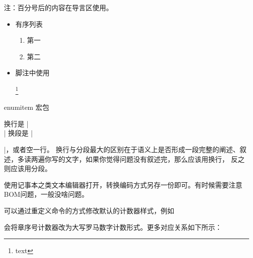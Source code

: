 




注：百分号后的内容在导言区使用。
\begin{itemize}
\item 有序列表
  \begin{texlist}
    \begin{enumerate}[label={\ding{\value*}},start=172]
    \item 第一
    \item 第二
    \end{enumerate}
  \end{texlist}
\item 脚注中使用
  \begin{texlist}

    \footnote{text}
  \end{texlist}
\end{itemize}



enumitem 宏包



换行是 |\\| 换段是 |\par|，或者空一行。
换行与分段最大的区别在于语义上是否形成一段完整的阐述、叙述，多读两遍你写的文字，如果你觉得问题没有叙述完，那么应该用换行，
反之则应该用分段。



使用记事本之类文本编辑器打开，转换编码方式另存一份即可。有时候需要注意BOM问题，一般没啥问题。



可以通过重定义命令的方式修改默认的计数器样式，例如
\begin{texinlist}
  \renewcommand{\thechapter}{\Roman{chapter}}
\end{texinlist}
会将章序号计数器改为大写罗马数字计数形式。更多对应关系如下所示：


